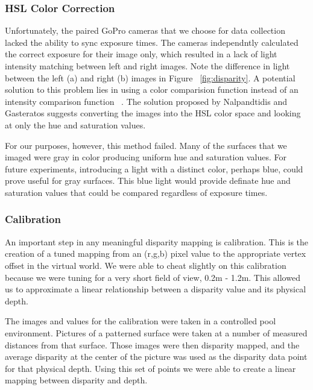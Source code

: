 \documentclass[a4paper,twoside]{article}
\begin{document}
\subsubsection{HSL Color Correction}
\label{subsec:hsl_color_correction}
Unfortunately, the paired GoPro cameras that we choose for data collection lacked the ability to sync exposure times.  
The cameras independntly calculated the correct exposure for their image only, which resulted in a lack of light intensity matching between left and right images.
Note the difference in light between the left (a) and right (b) images in Figure ~\ref{fig:disparity}.
A potential solution to this problem lies in using a color comparision function instead of an intensity comparison function ~\cite{stereo:nalGast}.
The solution proposed by Nalpandtidis and Gasteratos suggests converting the images into the HSL color space and looking at only the hue and saturation values.  
 
For our purposes, however, this method failed.  
Many of the surfaces that we imaged were gray in color producing uniform hue and saturation values.
For future experiments, introducing a light with a distinct color, perhaps blue, could prove useful for gray surfaces.  
This blue light would provide definate hue and saturation values that could be compared regardless of exposure times.


\subsubsection{Calibration}
\label{subsec:calibration}

An important step in any meaningful disparity mapping is calibration.
This is the creation of a tuned mapping from an (r,g,b) pixel value to the appropriate vertex offset in the virtual world. 
We were able to cheat slightly on this calibration because we were tuning for a very short field of view, 0.2m - 1.2m.
This allowed us to approximate a linear relationship between a disparity value and its physical depth. 

The images and values for the calibration were taken in a controlled pool environment.  
Pictures of a patterned surface were taken at a number of measured distances from that surface. 
Those images were then disparity mapped, and the average disparity at the center of the picture was used as the disparity data point for that physical depth.
Using this set of points we were able to create a linear mapping between disparity and depth.
\end{document}
